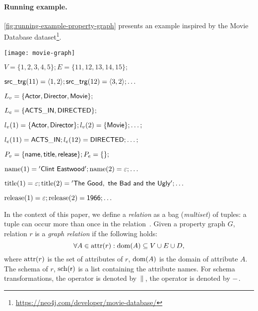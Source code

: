 \paragraph{Running example.} \autoref{fig:running-example-property-graph} presents an example inspired by the Movie Database dataset\footnote{\url{https://neo4j.com/developer/movie-database/}}.

\begin{minipage}[b]{0.48\linewidth}
	\texttt{[image: movie-graph]}
	\label{fig:running-example-property-graph}
\end{minipage}
\begin{minipage}[b]{0.53\linewidth}
	\footnotesize
	$V=\{1, 2, 3, 4, 5\}; E=\{11,12,13,14,15\};$
	
	$\mathsf{src\_trg}(11) = \langle 1, 2 \rangle; \mathsf{src\_trg}(12) = \langle 3, 2 \rangle; \ldots$

	$L_v = \{\mathsf{Actor}, \mathsf{Director}, \mathsf{Movie}\};$

	$L_e = \{\mathsf{ACTS\_IN}, \mathsf{DIRECTED}\};$

	$l_v(1) = \{\mathsf{Actor}, \mathsf{Director}\}; l_v(2) = \{\mathsf{Movie}\}; \ldots;$

	$l_e(11) = \mathsf{ACTS\_IN}; l_e(12) = \mathsf{DIRECTED}; \ldots;$

	$P_v = \{\mathsf{name}, \mathsf{title}, \mathsf{release}\}; P_e = \{\};$

	$\mathrm{name}(1) = \mathsf{'Clint~Eastwood'}; \mathrm{name}(2) = \varepsilon; \ldots$

	$\mathrm{title}(1) = \varepsilon; \mathrm{title}(2) = \mathsf{'The~Good,~the~Bad~and~the~Ugly'}; \ldots$
	
	$\mathrm{release}(1) = \varepsilon; \mathrm{release}(2) = \mathsf{1966}; \ldots$
	\label{fig:property-graph-formalized}
\end{minipage}

In the context of this paper, we define a \emph{relation} as a bag (\emph{multiset}) of tuples: a tuple can occur more than once in the relation~\cite{DBLP:books/daglib/0020812}.
Given a property graph $G$, relation $r$ is a \emph{graph relation} if the following holds:
$$\forall A \in \mathrm{attr}(r): \mathrm{dom}(A) \subseteq V \cup E \cup D,$$
where $\mathrm{attr}(r)$ is the set of attributes of $r$, $\mathrm{dom}(A)$ is the domain of attribute $A$. The schema of $r$, $\mathrm{sch}(\mathsf{r})$ is a list containing the attribute names. For schema transformations, the \appendtext operator is denoted by $\,\|\,$, the \removetext operator is denoted by $-$.

